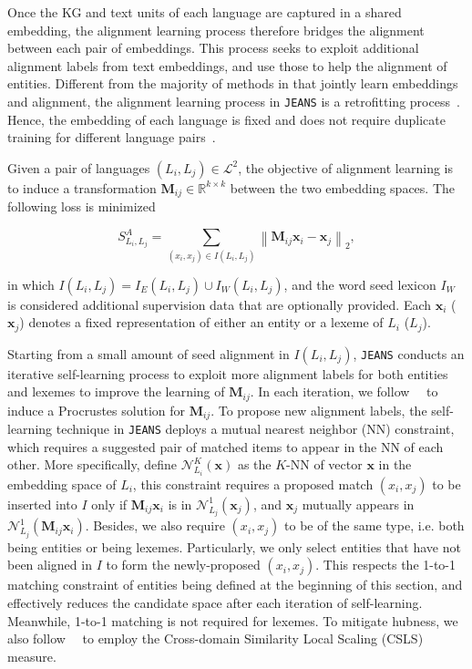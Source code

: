 \documentclass[11pt,a4paper]{article}
\newcommand{\modelname}[0]{\texttt{JEANS}\xspace}
\def\lang{\mathcal{L}}
\begin{document}
Once the KG and text units of each language are captured in a shared embedding,
the alignment learning process therefore bridges the alignment between each pair of embeddings.
This process seeks to exploit additional alignment labels from text embeddings,
and use those to help the alignment of entities.
Different from the majority of methods in  that jointly learn embeddings and alignment, the alignment learning process in \modelname is a retrofitting process~\cite{shi2019retrofit,faruqui2015retrofitting}.
Hence, the embedding of each language is fixed and does not require duplicate training for different language pairs~\cite{chen2017multigraph,sun2017cross}.



Given a pair of languages $(L_i, L_j)\in \lang^2$, the objective of alignment learning is to induce a transformation $\mathbf{M}_{ij}\in \mathbb{R}^{k\times k}$ between the two embedding spaces. The following loss is minimized

\begin{equation*}
    S^A_{L_i,L_j}=\sum_{(x_i,x_j)\in I(L_i,L_j)}\left \| \mathbf{M}_{ij}\mathbf{x}_i - \mathbf{x}_j \right \|_2,
\end{equation*}

\noindent
in which $I(L_i,L_j) = I_E(L_i,L_j) \cup I_W(L_i,L_j)$, and the word seed lexicon $I_W$ is considered additional supervision data that are optionally provided.
Each $\mathbf{x}_i$ ($\mathbf{x}_j$) denotes a fixed representation of either an entity or a lexeme of $L_i$ ($L_j$).

Starting from a small amount of seed alignment in $I(L_i,L_j)$, \modelname conducts an iterative self-learning process to exploit more alignment labels for both entities and lexemes to improve the learning of $\mathbf{M}_{ij}$.
In each iteration, we follow~\citeauthor{conneau2018word}~ to induce a Procrustes solution for $\mathbf{M}_{ij}$.
To propose new alignment labels, the self-learning technique in \modelname deploys a mutual nearest neighbor (NN) constraint, which requires a suggested pair of matched items to appear in the NN of each other.
More specifically, define $\mathcal{N}^K_{L_i}(\mathbf{x})$ as the $K$-NN of vector $\mathbf{x}$ in the embedding space of $L_i$, this constraint requires a proposed match $(x_i,x_j)$ to be inserted into $I$ only if $\mathbf{M}_{ij}\mathbf{x}_i$ is in $\mathcal{N}^1_{L_j}(\mathbf{x}_j)$, and $\mathbf{x}_j$ mutually appears in $\mathcal{N}^1_{L_j}(\mathbf{M}_{ij}\mathbf{x}_i)$.
Besides, we also require $(x_i,x_j)$ to be of the same type, i.e. both being entities or being lexemes.
Particularly, we only select entities that have not been aligned in $I$ to form the newly-proposed $(x_i,x_j)$.
This respects the 1-to-1 matching constraint of entities being defined at the beginning of this section, and effectively reduces the candidate space after each iteration of self-learning.
Meanwhile, 1-to-1 matching is not required for lexemes.
To mitigate hubness, 
we also follow~\citeauthor{conneau2018word}~ to employ the Cross-domain Similarity Local Scaling (CSLS) measure.
\end{document}
